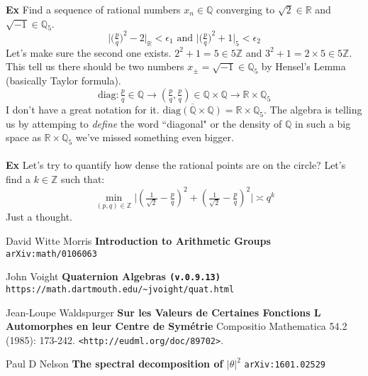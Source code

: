 \documentclass[12pt]{article}
\begin{document}
\newpage

\noindent \textbf{Ex} Find a sequence of rational numbers $x_n \in \mathbb{Q}$ converging to $\sqrt{2} \in \mathbb{R}$ and $\sqrt{-1} \in \mathbb{Q}_5$.
$$ \big| \big(\tfrac{p}{q}\big)^2 -2 \big|_\mathbb{R} < \epsilon_1 \text{ and }
\big|\big(\tfrac{p}{q}\big)^2 + 1 \big|_{5} < \epsilon_2 $$
Let's make sure the second one exists.  $2^2 + 1 = 5 \in 5 \mathbb{Z}$ and $3^2 + 1 = 2 \times 5 \in 5 \mathbb{Z}$.  This tell us there should be two numbers $x_\pm = \sqrt{-1} \in \mathbb{Q}_5$ by Hensel's Lemma (basically Taylor formula).
$$ \text{diag} : \tfrac{p}{q} \in \mathbb{Q} \to 
(\tfrac{p}{q} , \tfrac{p}{q} ) \in \mathbb{Q} \times \mathbb{Q} \to \mathbb{R} \times \mathbb{Q}_5 $$
I don't have a great notation for it. $\overline{\text{diag}(\mathbb{Q} \times \mathbb{Q})} = \mathbb{R} \times \mathbb{Q}_5$.  The algebra is telling us by attemping to \textit{define} the word ``diagonal" or the density of $\mathbb{Q}$ in such a big space as $\mathbb{R} \times \mathbb{Q}_5$ we've missed something even bigger. \\ \\
\textbf{Ex} Let's try to quantify how dense the rational points are on the circle? Let's find a $k \in \mathbb{Z}$ such that: 
$$  \min_{(p,q) \in \mathbb{Z}} \Big|( \tfrac{1}{\sqrt{2}} - \tfrac{p}{q})^2 + (\tfrac{1}{\sqrt{2}} - \tfrac{p}{q})^2 \Big|  \asymp q^k $$
Just a thought.

\vfill

\begin{thebibliography}{}

\item David Witte Morris \textbf{Introduction to Arithmetic Groups} \texttt{arXiv:math/0106063}

\item John Voight \textbf{Quaternion Algebras \texttt{(v.0.9.13)}} \texttt{https://math.dartmouth.edu/\~{}jvoight/quat.html}

\item Jean-Loupe Waldspurger \textbf{Sur les Valeurs de Certaines Fonctions L Automorphes en leur Centre de Sym\'{e}trie} Compositio Mathematica 54.2 (1985): 173-242. \texttt{<http://eudml.org/doc/89702>}.

\item Paul D Nelson \textbf{The spectral decomposition of $|\theta|^2$} \texttt{arXiv:1601.02529}

\end{thebibliography}
\end{document}

